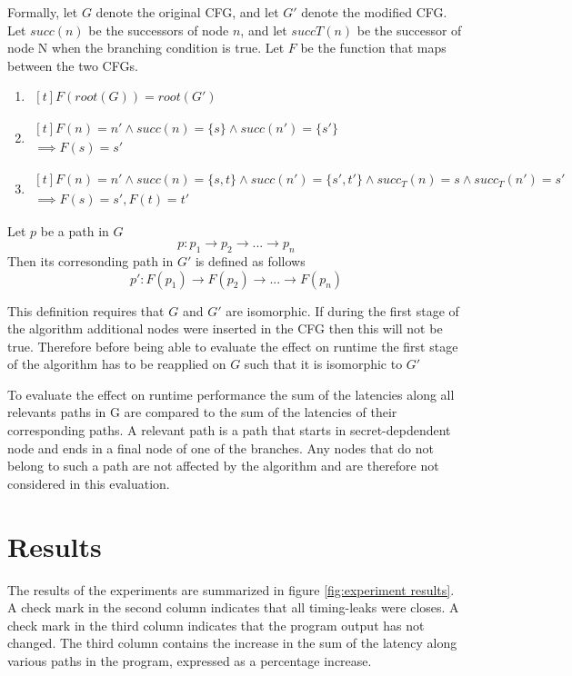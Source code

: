 Formally, let $G$ denote the original CFG, and let $G'$ denote the modified CFG. Let $succ(n)$ be the successors of node $n$, and let $succT(n)$ be 
the successor of node N when the branching condition is true. Let $F$ be the function that maps between the two CFGs.  
\begin{enumerate}
    \item $\begin{aligned}[t]
    F(root(G)) = root(G')
\end{aligned}$
\item $\begin{aligned}[t]
    F(n) = n' \land succ(n) = \{s\} \land succ(n')=\{s'\} \\ 
    \implies F(s)=s'
\end{aligned}$
\item $\begin{aligned}[t]
    F(n) = n' \land succ(n) = \{s, t\} \land succ(n')=\{s', t'\} \land succ_T(n)=s \land succ_T(n') = s'\\
    \implies F(s)=s', F(t) = t'
\end{aligned}$
\end{enumerate}
Let $p$ be a path in $G$
$$ p: p_1 \rightarrow p_2 \rightarrow ... \rightarrow p_n$$
Then its corresonding path in $G'$ is defined as follows 
$$ p': F(p_1) \rightarrow F(p_2) \rightarrow ... \rightarrow F(p_n)$$

This definition requires that $G$ and $G'$ are isomorphic. If during the first stage of the algorithm additional nodes were inserted in the CFG
then this will not be true. Therefore before being able to evaluate the effect on runtime the first stage of the algorithm has to be reapplied on $G$ such 
that it is isomorphic to $G'$

To evaluate the effect on runtime performance the sum of the latencies along all relevants paths in G are compared to the sum of the latencies of their corresponding paths. A relevant path is a path that starts in secret-depdendent node and ends in a final node of one of the branches. Any nodes that do not belong to such a path 
are not affected by the algorithm and are therefore not considered in this evaluation. 

    
\section{Results}
\label{sec:results}
The results of the experiments are summarized in figure \ref{fig:experiment results}.
A check mark in the second column indicates that all timing-leaks were closes. 
A check mark in the third column indicates that the program output has not changed. 
The third column contains the increase in the sum of the latency along various paths in the program, expressed as a percentage increase.

